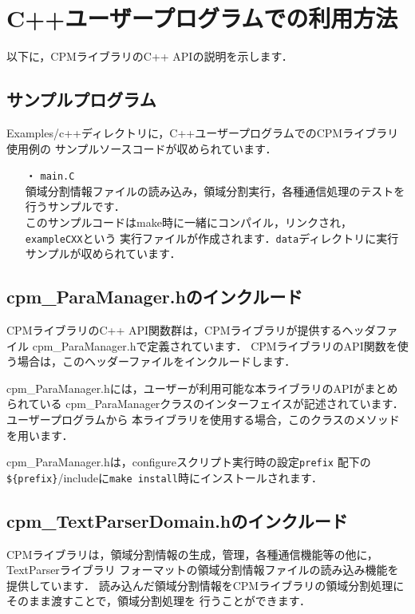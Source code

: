 \section{C++ユーザープログラムでの利用方法}
\label{use_cxx}
以下に，CPMライブラリのC++ APIの説明を示します．


\subsection{サンプルプログラム}

Examples/c++ディレクトリに，C++ユーザープログラムでのCPMライブラリ使用例の
サンプルソースコードが収められています．

\begin{itemize}
\item[・] {\tt main.C} \\
領域分割情報ファイルの読み込み，領域分割実行，各種通信処理のテストを行うサンプルです．\\
このサンプルコードはmake時に一緒にコンパイル，リンクされ，{\tt exampleCXX}という
実行ファイルが作成されます．{\tt data}ディレクトリに実行サンプルが収められています．
\end{itemize}


\subsection{cpm\_ParaManager.hのインクルード}

CPMライブラリのC++ API関数群は，CPMライブラリが提供するヘッダファイル
cpm\_ParaManager.hで定義されています．
CPMライブラリのAPI関数を使う場合は，このヘッダーファイルをインクルードします．

cpm\_ParaManager.hには，ユーザーが利用可能な本ライブラリのAPIがまとめられている
cpm\_ParaManagerクラスのインターフェイスが記述されています．ユーザープログラムから
本ライブラリを使用する場合，このクラスのメソッドを用います．

cpm\_ParaManager.hは，configureスクリプト実行時の設定{\tt prefix}
配下の{\tt \$\{prefix\}}/includeに{\tt make install}時にインストールされます．\\


\subsection{cpm\_TextParserDomain.hのインクルード}

CPMライブラリは，領域分割情報の生成，管理，各種通信機能等の他に，TextParserライブラリ
フォーマットの領域分割情報ファイルの読み込み機能を提供しています．
読み込んだ領域分割情報をCPMライブラリの領域分割処理にそのまま渡すことで，領域分割処理を
行うことができます．

